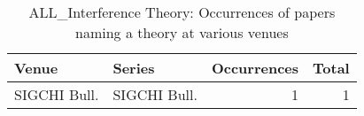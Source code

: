 \begin{table*}[t]
\begin{tabular}{llrr}
Venue & Series & Occurrences & Total\\\hline
\multirow{1}{*}{SIGCHI Bull.} & SIGCHI Bull. & 1 & \multirow{1}{*}{1}\\
\end{tabular}
\caption{ALL\_Interference Theory: Occurrences of papers naming a theory at various venues}
\end{table*}
